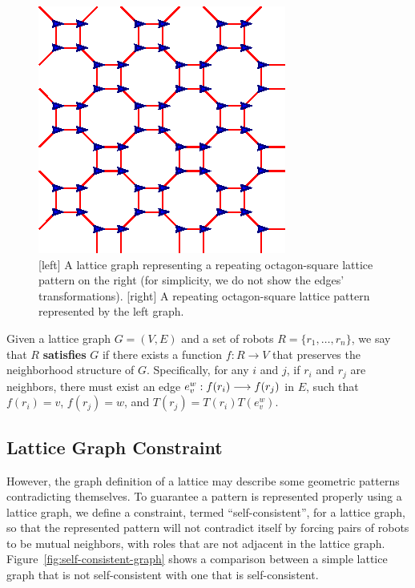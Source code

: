 \begin{figure}
    \centering
    \begin{minipage}[b]{0.45\linewidth}
        \centering
        
    \end{minipage}
    \begin{minipage}[b]{0.45\linewidth}
        \centering
        \includegraphics[scale=0.95]{figs/octsq-lat}
    \end{minipage}
    \caption{[left] A lattice graph representing a repeating octagon-square lattice pattern on the right (for simplicity, we do not show the edges' transformations). [right] A repeating octagon-square lattice pattern represented by the left graph.}
    \label{fig:octagonsquare}
\end{figure}

\begin{defn}
  Given a lattice graph $G=(V, E)$ and a set of robots
    $R = \{ r_1, \ldots, r_n \}$,
  we say that $R$ \textbf{satisfies} $G$ if there exists a function
    $f: R \rightarrow V$
  that preserves the neighborhood structure of $G$.
  Specifically, for any $i$ and $j$, if $r_i$ and $r_j$ are neighbors, 
  there must exist an edge
  $e_v^w: {f(r_i)}\overset{}{\longrightarrow}{f(r_j)}$ in $E$, such that 
      $f(r_i) = v$,
      $f(r_j) = w$, and $T(r_j) = T(r_i) T(e_{v}^w)$.
\end{defn}

\subsection{Lattice Graph Constraint}
However, the graph definition of a lattice may describe some geometric patterns contradicting themselves. To guarantee a pattern is represented properly using a lattice graph, we define a constraint, termed ``self-consistent'', for a lattice graph, so that the represented pattern will not contradict itself by forcing pairs of robots to be mutual neighbors, with roles that are not adjacent in the lattice graph. 
%
Figure~\ref{fig:self-consistent-graph} shows a comparison between a simple
lattice graph that is not self-consistent with one that is self-consistent.


